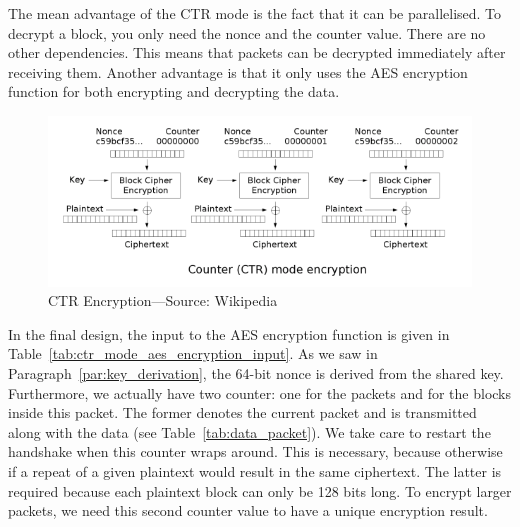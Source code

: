 \documentclass[a4paper]{article}
\begin{document}
The mean advantage of the CTR mode is the fact that it can be parallelised. To decrypt a block, you only need the nonce and the counter value. There are no other dependencies. This means that packets can be decrypted immediately after receiving them. Another advantage is that it only uses the AES encryption function for both encrypting and decrypting the data.

\begin{figure}[h]
    \centering
    \includegraphics[scale=0.75]{ctr_encryption.png}
    \caption{CTR Encryption---Source: Wikipedia}
    \label{fig:ctr_encryption}
\end{figure}

In the final design, the input to the AES encryption function is given in Table~\ref{tab:ctr_mode_aes_encryption_input}. As we saw in Paragraph~\ref{par:key_derivation}, the 64-bit nonce is derived from the shared key. Furthermore, we actually have two counter: one for the packets and for the blocks inside this packet. The former denotes the current packet and is transmitted along with the data (see Table~\ref{tab:data_packet}). We take care to restart the handshake when this counter wraps around. This is necessary, because otherwise if a repeat of a given plaintext would result in the same ciphertext. The latter is required because each plaintext block can only be 128 bits long. To encrypt larger packets, we need this second counter value to have a unique encryption result.
\end{document}
